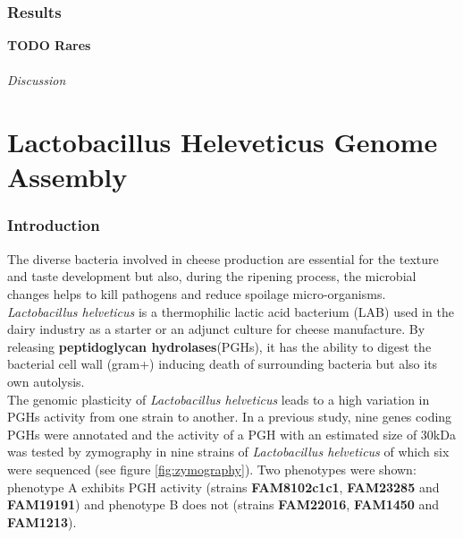 \documentclass[10pt,a4paper]{article}
\begin{document}




\section*{Results} \textbf{TODO Rares}

\paragraph{Discussion}









\newpage
\part*{Lactobacillus Heleveticus Genome Assembly}
\section*{Introduction}


The diverse bacteria involved in cheese production are essential for the texture and taste development but also, during the ripening process, the microbial changes helps to kill pathogens and reduce spoilage micro-organisms. \textit{Lactobacillus helveticus} is a thermophilic lactic acid bacterium (LAB) used in the dairy industry as a starter or an adjunct culture for cheese manufacture. By releasing \textbf{peptidoglycan hydrolases}(PGHs), it has the ability to digest the bacterial cell wall (gram+) inducing death of surrounding bacteria but also its own autolysis. \\

\noindent The genomic plasticity of \textit{Lactobacillus helveticus} leads to a high variation in PGHs activity from one strain to another. 
In a previous study\cite{jebava_nine_2011}, nine genes coding PGHs were annotated and the activity of a PGH with an estimated size of 30kDa was tested by zymography in nine strains of \textit{Lactobacillus helveticus} of which six were sequenced (see figure \ref{fig:zymography}). Two phenotypes were shown: phenotype A exhibits PGH activity (strains \textbf{FAM8102c1c1}, \textbf{FAM23285} and \textbf{FAM19191}) and phenotype B does not (strains \textbf{FAM22016}, \textbf{FAM1450} and \textbf{FAM1213}).\\
\end{document}
